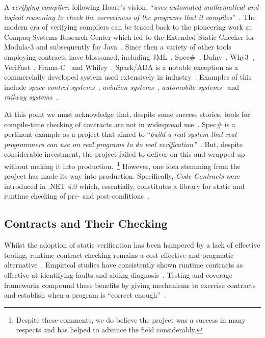 \documentclass[a4paper,UKenglish]{lipics-v2016}
\begin{document}
A {\em verifying compiler}, following Hoare's vision, ``{\em uses automated mathematical and logical reasoning to check the correctness of the programs that it compiles}''~\cite{Hoare03}.  The modern era of verifying compilers can be traced back to the pioneering work at Compaq Systems Research Center which led to the Extended Static Checker for Modula-3 and subsequently for Java~\cite{DLNS98,FLLNSS02}.  Since then a variety of other tools employing contracts have blossomed, including JML~\cite{CK04}, Spec\#~\cite{BFLMSV11,BDFLS04}, Dafny~\cite{Leino10,Leino12}, Why3~\cite{FP13}, VeriFast~\cite{JSP10,JSPVPP11}, Frama-C~\cite{CKKPSY12,GMKC13} and Whiley~\cite{Pea13c,Pea15c}.  Spark/ADA is a notable exception as a commercially developed system used extensively in industry~\cite{JC89,Barnes97}.  Examples of this include {\em space-control systems}~\cite{BC13}, {\em aviation systems}~\cite{CS14}, {\em automobile systems}~\cite{HKAS14} and {\em railway systems}~\cite{DELMM14}.

At this point we must acknowledge that, despite some success stories, tools for compile-time checking of contracts are not in widespread use~\cite{BH06,MG14}.  Spec\# is a pertinent example as a project that aimed to ``{\em build a real system that real programmers can use on real programs to do real verification''}~\cite{BFLMSV11}.  But, despite considerable investment, the project failed to deliver on this and wrapped up without making it into production.~\footnote{Despite these comments, we do believe the project was a success in many respects and has helped to advance the field considerably.}  However, one idea stemming from the project has made its way into production.  Specifically, {\em Code Contracts} were introduced in .NET 4.0 which, essentially, constitutes a library for static and runtime checking of pre- and post-conditions~\cite{FBL10}. 

\subsection{Contracts and Their Checking}

Whilst the adoption of static verification has been hampered by a lack of effective tooling, runtime contract checking remains a cost-effective and pragmatic alternative~\cite{CR06}.  Empirical studies have consistently shown runtime contracts as effective at identifying faults and aiding diagnosis~\cite{Rosen95,SR11,ABL14,CDOFR15}.  Testing and coverage frameworks compound these benefits by giving mechanisms to exercise contracts and establish when a program is ``correct enough''~\cite{Hoare03b,PFP13}.
\end{document}
